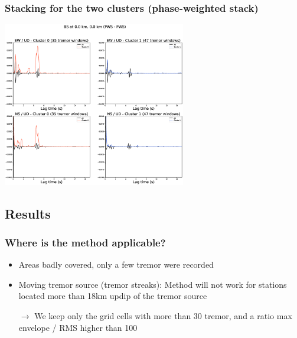 \documentclass{beamer}
\begin{document}
	\begin{frame}
		\frametitle{Stacking for the two clusters (phase-weighted stack)}
		\begin{center}
			\includegraphics[width=8cm, trim={4.5cm 2.5cm 5cm 4cm}, clip]{BS/BS_000_000_PWS_PWS_cluster_stackcc.eps}
		\end{center}
	\end{frame}


	\subsection{Results}

	\begin{frame}
		\frametitle{Where is the method applicable?}
		\vspace{1em}

		\begin{itemize}
			\item Areas badly covered, only a few tremor were recorded

			\vspace{1em}

			\item Moving tremor source (tremor streaks): Method will not work for stations located more than 18km updip of the tremor source

			\vspace{1em}

			$\rightarrow$ We keep only the grid cells with more than 30 tremor, and a ratio max envelope / RMS higher than 100
		\end{itemize}
	\end{frame}
\end{document}

